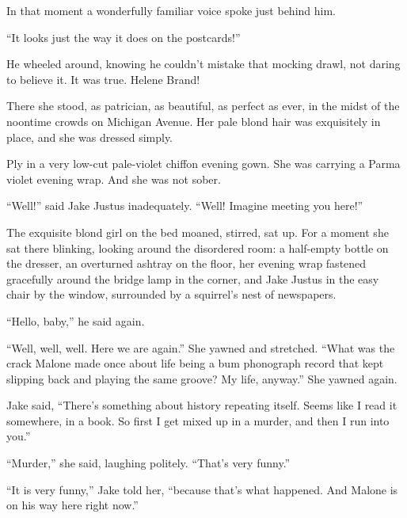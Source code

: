 \documentclass{novel}
\begin{document}
In that moment a wonderfully familiar voice spoke just behind him.

“It looks just the way it does on the postcards!”

He wheeled around, knowing he couldn’t mistake that mocking drawl, not daring to believe it. It was true. Helene Brand!

There she stood, as patrician, as beautiful, as perfect as ever, in the midst of the noontime crowds on Michigan Avenue. Her pale blond hair was exquisitely in place, and she was dressed simply.

Ply in a very low-cut pale-violet chiffon evening gown. She was carrying a Parma violet evening wrap. And she was not sober.

“Well!” said Jake Justus inadequately. “Well! Imagine meeting you here!”

\vspace{2\nbs}
\clearpage
\thispagestyle{empty}

\begin{ChapterStart}
\vspace{3\nbs}
\end{ChapterStart}

The exquisite blond girl on the bed moaned, stirred, sat up. For a moment she sat there blinking, looking around the disordered room: a half-empty bottle on the dresser, an overturned ashtray on the floor, her evening wrap fastened gracefully around the bridge lamp in the corner, and Jake Justus in the easy chair by the window, surrounded by a squirrel’s nest of newspapers.

“Hello, baby,” he said again.

“Well, well, well. Here we are again.” She yawned and stretched. “What was the crack Malone made once about life being a bum phonograph record that kept slipping back and playing the same groove? My life, anyway.” She yawned again.

Jake said, “There’s something about history repeating itself. Seems like I read it somewhere, in a book. So first I get mixed up in a murder, and then I run into you.”

“Murder,” she said, laughing politely. “That’s very funny.”

“It is very funny,” Jake told her, “because that’s what happened. And Malone is on his way here right now.”
\end{document}
